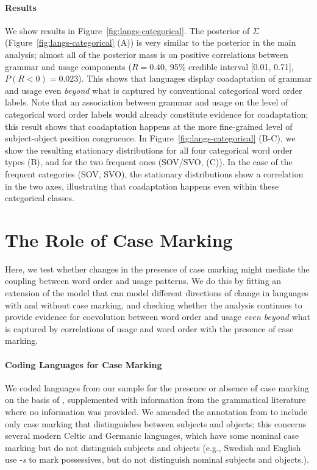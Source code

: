 \documentclass[11pt,a4paper]{article}
\begin{document}
\paragraph{Results}
We show results in Figure~\ref{fig:langs-categorical}.
The posterior of $\Sigma$ (Figure~\ref{fig:langs-categorical} (A)) is very similar to the posterior in the main analysis; almost all of the posterior mass is on positive correlations between grammar and usage components ($R = 0.40$, 95\% credible interval [0.01, 0.71], $P(R<0) = 0.023$). %
This shows that languages display coadaptation of grammar and usage even \emph{beyond} what is captured by conventional categorical word order labels.
Note that an association between grammar and usage on the level of categorical word order labels would already constitute evidence for coadaptation; this result shows that coadaptation happens at the more fine-grained level of subject-object position congruence.
In Figure~\ref{fig:langs-categorical} (B-C), we show the resulting stationary distributions for all four categorical word order types (B), and for the two frequent ones (SOV/SVO, (C)).
In the case of the frequent categories (SOV, SVO), the stationary distributions show a correlation in the two axes, illustrating that coadaptation happens even within these categorical classes.

\section{The Role of Case Marking}

Here, we test whether changes in the presence of case marking might mediate the coupling between word order and usage patterns.
We do this by fitting an extension of the model that can model different directions of change in languages with and without case marking, and checking whether the analysis continues to provide evidence for coevolution between word order and usage \emph{even beyond} what is captured by correlations of usage and word order with the presence of case marking.


\paragraph{Coding Languages for Case Marking}
We coded languages from our sample for the presence or absence of case marking on the basis of \citep{wals-49}, supplemented with information from the grammatical literature where no information was provided.
We amended the annotation from \citep{wals-49} to include only case marking that distinguishes between subjects and objects; this concerns several modern Celtic and Germanic languages, which have some nominal case marking but do not distinguish subjects and objects (e.g., Swedish and English use -\textit{s} to mark possessives, but do not distinguish nominal subjects and objects.).
\end{document}
